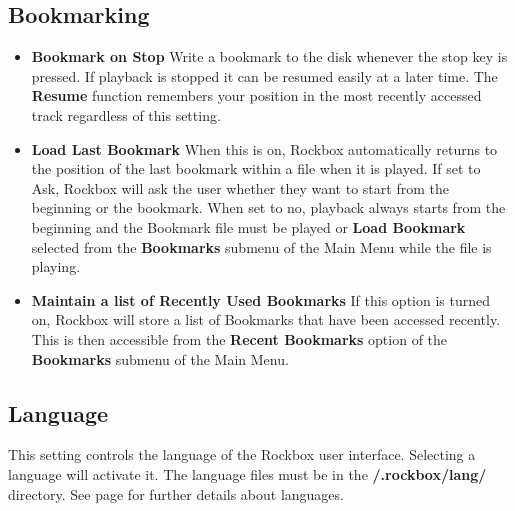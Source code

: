 \begin{itemize}
\end{itemize}

\subsection{\label{ref:Bookmarkconfigactual}Bookmarking}

\begin{itemize}
\item \textbf{Bookmark on Stop}
  Write a bookmark to the disk whenever the stop key is pressed.  If playback is stopped it can be resumed easily at a later time. The \textbf{Resume} function remembers your position in the most recently accessed track regardless of this setting.
\item \textbf{Load Last Bookmark}
  When this is on, Rockbox automatically returns to the position of the last bookmark within a file when it is played.  If set to Ask, Rockbox will ask the user whether they want to start from the beginning or the bookmark.  When set to no, playback always starts from the beginning and the Bookmark file must be played or \textbf{Load Bookmark} selected from the \textbf{Bookmarks} submenu of the Main Menu while the file is playing.
\item \textbf{Maintain a list of Recently Used Bookmarks}
  If this option is turned on, Rockbox will store a list of Bookmarks that have been accessed recently.  This is then accessible from the \textbf{Recent Bookmarks} option of the \textbf{Bookmarks} submenu of the Main Menu.
\end{itemize}

\subsection{\label{ref:Language}Language}
This setting controls the language of the Rockbox user interface. Selecting  a language will activate it. The language files must be in the \textbf{/.rockbox/lang/} directory. See page \pageref{ref:Loadinglanguages} for further details about languages.

